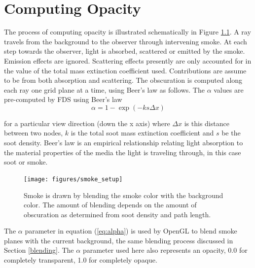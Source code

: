 \documentclass[11pt,twoside]{book}
\begin{document}


%
%

\chapter{Computing Opacity}
The process of computing opacity is illustrated schematically in Figure \ref{figsmokesetup}.
A ray travels from the background to the observer through intervening smoke.
At each step towards the observer, light is absorbed, scattered or emitted by the smoke.  Emission effects are ignored.  Scattering effects presently are only accounted for in the value of the total mass extinction coefficient used.  Contributions are assume to be from both absorption and scattering.  
The obscuration is computed along each ray one grid plane at a time, using Beer's law as follows.  The $\alpha$ values are pre-computed by FDS using Beer's
law\cite{Siegel:2001}
\begin{equation}
\alpha=1-\exp(-ks\Delta x) \label{eq:alpha}
\end{equation}

\noindent for a particular view direction (down the x axis) where $\Delta x$
is this distance between two nodes, $k$ is the total soot mass
extinction coefficient and $s$ be the soot density. Beer's law is
an empirical relationship relating light absorption to the
material properties of the media the light is traveling through,
in this case soot or smoke.  

\begin{figure}[t]
\begin{center}
\texttt{[image: figures/smoke\_setup]}
\end{center}
\caption {Smoke is drawn by blending the smoke color with the
background color.  The amount of blending depends on the amount of
obscuration as determined from soot density and path length.}
\label{figsmokesetup}
\end{figure}

The $\alpha$ parameter in equation (\ref{eq:alpha}) is used by OpenGL to blend smoke planes with the current background, the same blending process discussed in Section \ref{blending}.  The $\alpha$ parameter used here also represents an opacity, 0.0 for completely transparent, 1.0 for completely opaque.
\end{document}
